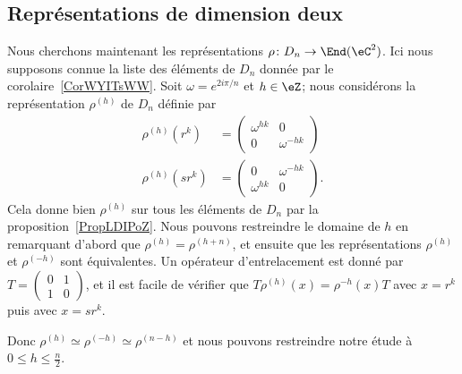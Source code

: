 \subsection{Représentations de dimension deux}

Nous cherchons maintenant les représentations \( \rho\colon D_n\to \End(\eC^2)\). Ici nous supposons connue la liste des éléments de \( D_n\) donnée par le corolaire~\ref{CorWYITsWW}. Soit \( \omega= e^{2i\pi/n}\) et \( h\in \eZ\); nous considérons la représentation \( \rho^{(h)}\) de \( D_n\) définie par
\begin{subequations}
	\begin{align}
		\rho^{(h)}(r^k)  & =\begin{pmatrix}
			                    \omega^{hk} & 0            \\
			                    0           & \omega^{-hk}
		                    \end{pmatrix} \\
		\rho^{(h)}(sr^k) & =\begin{pmatrix}
			                    0           & \omega^{-hk} \\
			                    \omega^{hk} & 0
		                    \end{pmatrix}.
	\end{align}
\end{subequations}
Cela donne bien \( \rho^{(h)}\) sur tous les éléments de \( D_n\) par la proposition~\ref{PropLDIPoZ}. Nous pouvons restreindre le domaine de \( h\) en remarquant d'abord que \( \rho^{(h)}=\rho^{(h+n)}\), et ensuite que les représentations \( \rho^{(h)}\) et \( \rho^{(-h)}\) sont équivalentes. Un opérateur d'entrelacement est donné par \( T=\begin{pmatrix}
	0 & 1 \\
	1 & 0
\end{pmatrix}\), et il est facile de vérifier que \( T\rho^{(h)}(x)=\rho^{-h}(x)T\) avec \( x=r^k\) puis avec \( x=sr^k\).

Donc \( \rho^{(h)}\simeq\rho^{(-h)}\simeq\rho^{(n-h)}\) et nous pouvons restreindre notre étude à \( 0\leq h\leq \frac{ n }{2}\).

